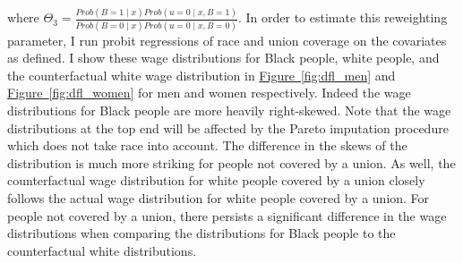 \documentclass[11pt]{article}
\begin{document}
where $\Theta_3 = \frac{Prob(B = 1\mid x) Prob(u = 0\mid x, B = 1)}{Prob(B = 0\mid x)Prob(u = 0\mid x, B = 0)}$. In order to estimate this reweighting parameter, I run probit regressions of race and union coverage on the covariates as defined. I show these wage distributions for Black people, white people, and the counterfactual white wage distribution in \hyperref[fig:dfl_men]{Figure~\ref*{fig:dfl_men}} and \hyperref[fig:dfl_women]{Figure~\ref*{fig:dfl_women}} for men and women respectively. Indeed the wage distributions for Black people are more heavily right-skewed. Note that the wage distributions at the top end will be affected by the Pareto imputation procedure which does not take race into account. The difference in the skews of the distribution is much more striking for people not covered by a union. As well, the counterfactual wage distribution for white people covered by a union closely follows the actual wage distribution for white people covered by a union. For people not covered by a union, there persists a significant difference in the wage distributions when comparing the distributions for Black people to the counterfactual white distributions.   
\end{document}
